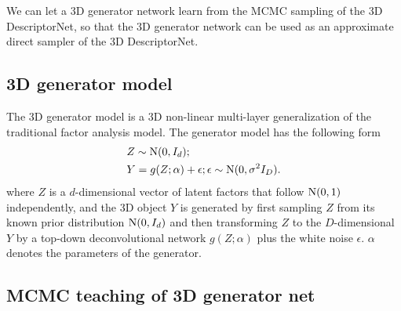 \documentclass[10pt,twocolumn,letterpaper]{article}
\def\hY{\hat{Y}}
\begin{document}

We can let a 3D generator network learn from the MCMC sampling of the 3D DescriptorNet, so that the 3D generator network can be used as an approximate direct sampler of the 3D DescriptorNet. 

\subsection{3D generator model} 

The 3D generator model \cite{goodfellow2014generative} is a 3D non-linear multi-layer generalization of the traditional factor analysis model. The generator model has the following form
\begin{eqnarray} 
& Z \sim {\rm N}(0, I_d);\nonumber \\ 
 & Y = g(Z; \alpha)  + \epsilon; \epsilon \sim {\rm N}(0, \sigma^2 I_D). \label{eq:NFA}
 \end{eqnarray}
 where $Z$ is a $d$-dimensional vector of latent factors that follow ${\rm N}(0, 1)$ independently, and the 3D object $Y$ is generated by first sampling $Z$ from its known prior distribution ${\rm N}(0, I_d)$ and then transforming $Z$ to the $D$-dimensional $Y$ by a top-down deconvolutional network $g(Z; \alpha)$ plus the white noise $\epsilon$.  $\alpha$ denotes the parameters of the generator.

\subsection{MCMC teaching of 3D generator net} 
\end{document}
